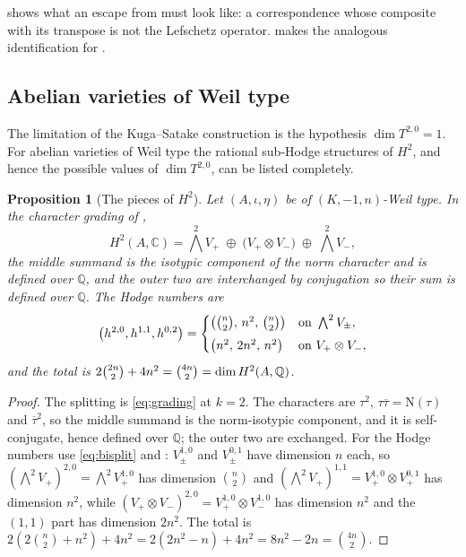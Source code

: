 \documentclass[11pt,reqno]{amsart}
\theoremstyle{plain}
\newtheorem{proposition}[theorem]{Proposition}
\theoremstyle{definition}
\theoremstyle{remark}
\newcommand{\QQ}{\mathbb{Q}}
\newcommand{\CC}{\mathbb{C}}
\newcommand{\Nm}{\mathrm{N}}             %
\newcommand{\bbar}[1]{\overline{#1}}
\begin{document}
 shows what an escape from 
must look like: a correspondence whose composite with its transpose is not the
Lefschetz operator.  makes the analogous identification for
.

\subsection{Abelian varieties of Weil type}

The limitation of the Kuga--Satake construction is the hypothesis
$\dim T^{2,0}=1$. For abelian varieties of Weil type the rational sub-Hodge
structures of $H^{2}$, and hence the possible values of $\dim T^{2,0}$, can be
listed completely.

\begin{proposition}[The pieces of \texorpdfstring{$H^{2}$}{H2}]\label{prop:h2pieces}
Let $(A,\iota,\eta)$ be of $(K,-1,n)$-Weil type. In the character grading of
,
\begin{equation}\label{eq:h2split}
  H^{2}(A,\CC)
  =\textstyle\bigwedge^{2}V_{+}\;\oplus\;\bigl(V_{+}\otimes V_{-}\bigr)
   \;\oplus\;\bigwedge^{2}V_{-},
\end{equation}
the middle summand is the isotypic component of the norm character and is
defined over $\QQ$, and the outer two are interchanged by conjugation so their
sum is defined over $\QQ$. The Hodge numbers are
\[
  \bigl(h^{2,0},h^{1,1},h^{0,2}\bigr)=
  \begin{cases}
    \bigl(\tbinom{n}{2},\,n^{2},\,\tbinom{n}{2}\bigr)
      & \text{on }\bigwedge^{2}V_{\pm},\\[4pt]
    \bigl(n^{2},\,2n^{2},\,n^{2}\bigr)
      & \text{on }V_{+}\otimes V_{-},
  \end{cases}
\]
and the total is $2\tbinom{2n}{2}+4n^{2}=\tbinom{4n}{2}=\dim H^{2}(A,\QQ)$.
\end{proposition}

\begin{proof}
The splitting is \eqref{eq:grading} at $k=2$. The characters are
$\tau^{2}$, $\tau\bbar{\tau}=\Nm(\tau)$ and $\bbar{\tau}^{2}$, so the middle
summand is the norm-isotypic component, and it is self-conjugate, hence defined
over $\QQ$; the outer two are exchanged. For the Hodge numbers use
\eqref{eq:bisplit} and : $V_{\pm}^{1,0}$ and
$V_{\pm}^{0,1}$ have dimension $n$ each, so
$(\bigwedge^{2}V_{+})^{2,0}=\bigwedge^{2}V^{1,0}_{+}$ has dimension
$\binom{n}{2}$ and $(\bigwedge^{2}V_{+})^{1,1}=V^{1,0}_{+}\otimes V^{0,1}_{+}$
has dimension $n^{2}$, while
$(V_{+}\otimes V_{-})^{2,0}=V^{1,0}_{+}\otimes V^{1,0}_{-}$ has dimension
$n^{2}$ and the $(1,1)$ part has dimension $2n^{2}$. The total is
$2(2\binom{n}{2}+n^{2})+4n^{2}=2(2n^{2}-n)+4n^{2}=8n^{2}-2n=\binom{4n}{2}$.
\end{proof}
\end{document}
